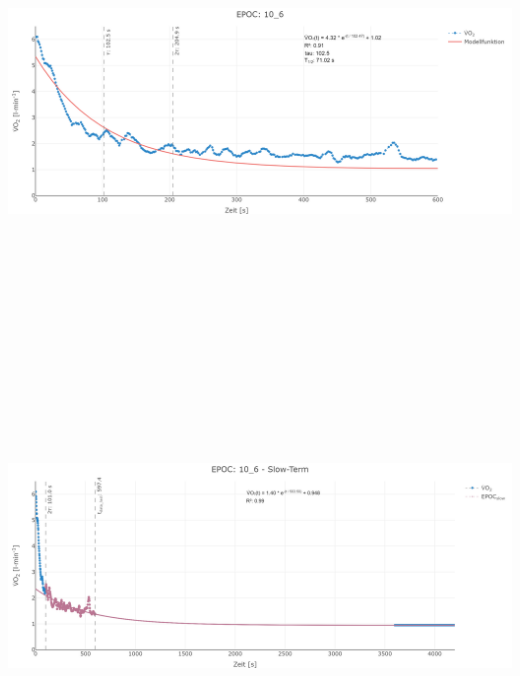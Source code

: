 \documentclass[
  letterpaper,
  DIV=11]{scrartcl}
\begin{document}
\includegraphics[width=11.45833in,height=4.6875in]{images/10_6_tau.png}
\includegraphics[width=11.45833in,height=4.6875in]{images/10_6_slow.png}
\end{document}
